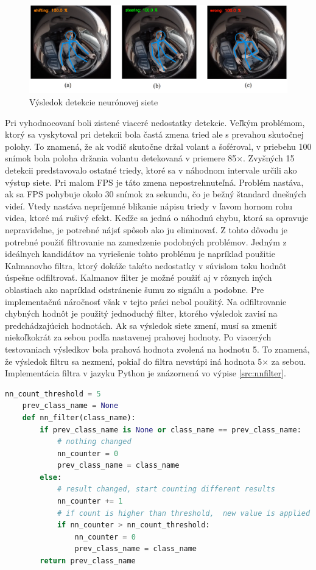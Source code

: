 \documentclass[slovak,master,dept460,male,cpp,cpdeclaration]{diploma}
\begin{document}
\begin{figure}[H]
	\centering
	\includegraphics[width=1\textwidth]{Figures/nnresult2.png}
	\caption{Výsledok detekcie neurónovej siete}
	\label{fig:nnresult1}
\end{figure}

Pri vyhodnocovaní boli zistené viaceré nedostatky detekcie. Veľkým problémom, ktorý sa vyskytoval pri detekcii bola častá zmena tried ale s prevahou skutočnej polohy. To znamená, že ak vodič skutočne držal volant a šoféroval, v priebehu 100 snímok bola poloha držania volantu detekovaná v priemere 85$\times$. Zvyšných 15 detekcii predstavovalo ostatné triedy, ktoré sa  v náhodnom intervale  určili ako výstup siete. Pri malom FPS je táto zmena nepostrehnuteľná. Problém nastáva, ak sa FPS pohybuje okolo 30 snímok za sekundu, čo je bežný štandard dnešných videí. Vtedy nastáva nepríjemné blikanie nápisu triedy  v ľavom hornom rohu videa, ktoré má rušivý efekt. Keďže sa jedná o náhodnú chybu, ktorá sa opravuje nepravidelne, je potrebné nájsť spôsob ako ju eliminovať. Z tohto dôvodu je potrebné použiť filtrovanie na zamedzenie podobných problémov. Jedným z ideálnych kandidátov na vyriešenie tohto problému je napríklad použitie Kalmanovho filtra\cite{kalman1960}, ktorý dokáže takéto nedostatky v súvislom toku hodnôt úspešne odfiltrovať. Kalmanov filter je možné použiť aj  v rôznych iných oblastiach ako napríklad odstránenie šumu zo signálu a podobne. Pre implementačnú náročnosť však v tejto práci nebol použitý. Na odfiltrovanie  chybných hodnôt je použitý jednoduchý filter, ktorého výsledok zavisí na predchádzajúcich hodnotách. Ak sa výsledok siete zmení, musí sa zmeniť niekoľkokrát za sebou podľa nastavenej prahovej hodnoty. Po viacerých testovaniach výsledkov  bola prahová hodnota zvolená na hodnotu 5. To znamená, že  výsledok filtru  sa nezmení, pokiaľ do filtra nevstúpi  iná hodnota 5$\times$ za sebou. Implementácia filtra v jazyku Python je znázornená vo výpise \ref{src:nnfilter}.

\begin{lstlisting}[language=Python,label=src:nnfilter,caption={Jednoduchý filter na odstránenie náhodných hodnôt s použitím prahovej hodnoty}]
	nn_count_threshold = 5
	prev_class_name = None
	def nn_filter(class_name):
    	if prev_class_name is None or class_name == prev_class_name:
    		# nothing changed
        	nn_counter = 0
        	prev_class_name = class_name
    	else:
    		# result changed, start counting different results
        	nn_counter += 1
        	# if count is higher than threshold,  new value is applied
        	if nn_counter > nn_count_threshold:
            	nn_counter = 0
            	prev_class_name = class_name
    	return prev_class_name
\end{lstlisting}
\end{document}
